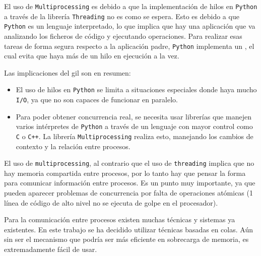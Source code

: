 El uso de \texttt{Multiprocessing} es debido a que la implementación de hilos en \texttt{Python} a través de la librería \texttt{Threading} no es como se espera. Esto es debido a que \texttt{Python} es 
un lenguaje interpretado, lo que implica que hay una aplicación que va analizando los ficheros de código y ejecutando operaciones.\newline
Para realizar esas tareas de forma segura respecto a la aplicación padre, \texttt{Python} implementa un \texttt{}, el cual evita que haya más de un hilo en ejecución a la vez.

Las implicaciones del \acrshort{gil} son en resumen:
\begin{itemize}
    \item El uso de hilos en \texttt{Python} se limita a situaciones especiales donde haya mucho \texttt{I/O}, ya que no son capaces de funcionar en paralelo.
    \item Para poder obtener concurrencia real, se necesita usar librerías que manejen varios intérpretes de \texttt{Python} a través de un lenguaje con mayor control como \texttt{C} o \texttt{C++}. 
    La librería \texttt{Multiprocessing} realiza esto, manejando los cambios de contexto y la relación entre procesos.
\end{itemize}

El uso de \texttt{multiprocessing}, al contrario que el uso de \texttt{threading} implica que no hay memoria compartida entre procesos, por lo tanto hay que pensar la forma para comunicar información 
entre procesos. Es un punto muy importante, ya que pueden aparecer problemas de concurrencia por falta de operaciones atómicas (1 línea de código de alto nivel no se ejecuta de golpe en el procesador).

Para la comunicación entre procesos existen muchas técnicas y sistemas ya existentes. En este trabajo se ha decidido utilizar técnicas basadas en colas. Aún sin ser el mecanismo que podría ser más 
eficiente en sobrecarga de memoria, es extremadamente fácil de usar.

